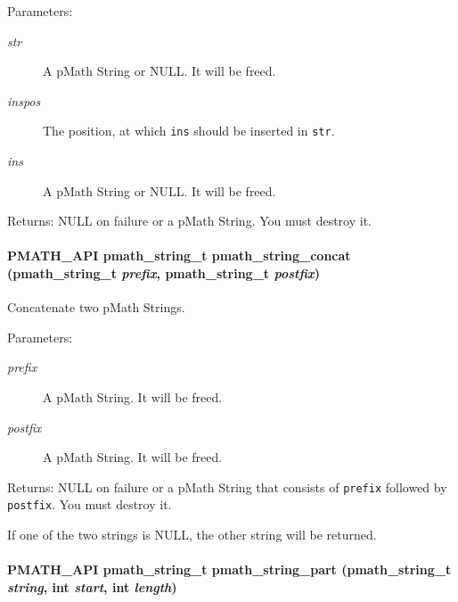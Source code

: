 \begin{Desc}
\item[Parameters:]
\begin{description}
\item[{\em str}]A pMath String or NULL. It will be freed. \item[{\em inspos}]The position, at which {\tt ins} should be inserted in {\tt str}. \item[{\em ins}]A pMath String or NULL. It will be freed. \end{description}
\end{Desc}
\begin{Desc}
\item[Returns:]NULL on failure or a pMath String. You must destroy it. \end{Desc}
\hypertarget{group__strings_g2594ada00fefcbede1420bf19b806de6}{
\paragraph[{pmath\_\-string\_\-concat}]{\setlength{\rightskip}{0pt plus 5cm}PMATH\_\-API {\bf pmath\_\-string\_\-t} pmath\_\-string\_\-concat ({\bf pmath\_\-string\_\-t} {\em prefix}, \/  {\bf pmath\_\-string\_\-t} {\em postfix})}\hfill}
\label{group__strings_g2594ada00fefcbede1420bf19b806de6}


Concatenate two pMath Strings. 

\begin{Desc}
\item[Parameters:]
\begin{description}
\item[{\em prefix}]A pMath String. It will be freed. \item[{\em postfix}]A pMath String. It will be freed. \end{description}
\end{Desc}
\begin{Desc}
\item[Returns:]NULL on failure or a pMath String that consists of {\tt prefix} followed by {\tt postfix}. You must destroy it.\end{Desc}
If one of the two strings is NULL, the other string will be returned. \hypertarget{group__strings_gb99f797d2a7670ff6a44d788d07812cd}{
\paragraph[{pmath\_\-string\_\-part}]{\setlength{\rightskip}{0pt plus 5cm}PMATH\_\-API {\bf pmath\_\-string\_\-t} pmath\_\-string\_\-part ({\bf pmath\_\-string\_\-t} {\em string}, \/  int {\em start}, \/  int {\em length})}\hfill}
\label{group__strings_gb99f797d2a7670ff6a44d788d07812cd}


